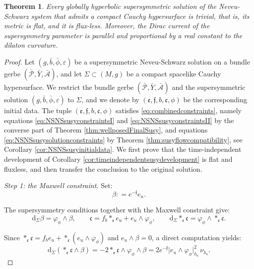\documentclass[10pt,reqno,a4paper]{amsart}
\theoremstyle{plain}
\newtheorem{thm}{Theorem}[section]
\theoremstyle{definition}
\theoremstyle{remark}
\theoremstyle{remark}
\def\dd{\mathrm{d}}
\def\cA{\mathcal{A}}
\def\cP{\mathcal{P}}
\def\frc{\mathfrak{c}}
\def\fre{\mathfrak{e}}
\renewcommand{\(}{ (}
\renewcommand{\)}{ )}
\newcommand{\frf}{\mathfrak{f}}
\begin{document}
\begin{thm}
\label{thm:compactrigidity}
Every globally hyperbolic supersymmetric solution of the Neveu-Schwarz system that admits a compact Cauchy hypersurface is trivial, that is, its metric is flat, and it is flux-less. Moreover, the Dirac current of the supersymmetry parameter is parallel and proportional by a real constant to the dilaton curvature.  
\end{thm}

\begin{proof}
Let $(g,\bar{b},\bar{\phi},\varepsilon)$ be a supersymmetric Neveu-Schwarz solution on a bundle gerbe $(\bar{\cP},\bar{Y},\bar{\cA})$, and let $\Sigma\subset(M,g)$ be a compact spacelike Cauchy hypersurface. We restrict the bundle gerbe $(\bar{\cP},\bar{Y},\bar{\cA})$ and the supersymmetric solution $(g,\bar{b},\bar{\phi},\varepsilon)$ to $\Sigma$, and we denote by $(\fre,\frf,b,\frc,\phi)$ be the corresponding initial data. The tuple $(\fre,\frf,b,\frc,\phi)$ satisfies \eqref{eq:combinedconstraints}, namely equations \eqref{eq:NSNSsusyconstraintsI} and \eqref{eq:NSNSsusyconstraintsII} by the converse part of Theorem \ref{thm:wellposedFinalSusy}, and equations \eqref{eq:NSNSsusysolutionconstraints} by Theorem \ref{thm:susyflowcompatibility}, see Corollary \ref{cor:NSNSsusyinitialdata}. We first prove that the time-independent development of Corollary \ref{cor:timeindependentsusydevelopment} is flat and fluxless, and then transfer the conclusion to the original solution. 
	
	
\medskip
\noindent
\emph{Step 1: the Maxwell constraint.} Set:
\begin{equation*}
\beta : =e^{-\frf}e_u.
\end{equation*}
	
\noindent
The supersymmetry conditions together with the Maxwell constraint give:
\begin{equation*}
\dd_{\Sigma}\beta=\varphi_{\phi}\wedge\beta, \qquad \frc=f_b\ast_{\fre}e_u+e_u\wedge\varphi_{\phi}, \qquad \dd_{\Sigma}\ast_{\fre}\frc = \varphi_{\phi}\wedge\ast_{\fre}\frc.
\end{equation*}
	
\noindent
Since $\ast_{\fre}\frc=f_be_u+\ast_{\fre}(e_u\wedge\varphi_{\phi})$ and $e_u\wedge\beta=0$, a direct computation yields:
\begin{equation*}
\dd_{\Sigma}(\ast_{\fre}\frc\wedge\beta) = - 2 \ast_{\fre}\frc\wedge\varphi_{\phi}\wedge\beta = 2e^{-\frf} \vert e_u\wedge\varphi_{\phi}\vert_{h_{\fre}}^2 \,\nu_{h_{\fre}}.
\end{equation*}
	

\end{proof}
\end{document}
